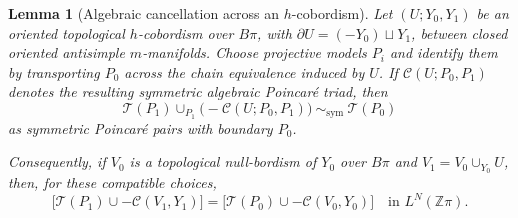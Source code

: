 \documentclass[10pt,reqno]{amsart}
\numberwithin{equation}{section}
\newtheorem{lemma}{Lemma}
\theoremstyle{definition}
\theoremstyle{remark}
\newcommand{\Z}{\mathbb Z}
\begin{document}
\begin{lemma}[Algebraic cancellation across an \(h\)-cobordism]
\label{lem:absolute-rho-hcob-cancellation}
Let \((U;Y_0,Y_1)\) be an oriented topological \(h\)-cobordism over
\(B\pi\), with
\(\partial U=(-Y_0)\sqcup Y_1\), between closed oriented antisimple
\(m\)-manifolds.  Choose projective models \(P_i\) and identify them
by transporting \(P_0\) across the chain equivalence induced by
\(U\).  If
\(\mathcal C(U;P_0,P_1)\) denotes the resulting symmetric algebraic
Poincar\'e triad, then
\begin{equation}\label{eq:absolute-rho-relative-cancellation}
\mathcal T(P_1)
\cup_{P_1}
\bigl(-\mathcal C(U;P_0,P_1)\bigr)
\ \sim_{\mathrm{sym}}\
\mathcal T(P_0)
\end{equation}
as symmetric Poincar\'e pairs with boundary \(P_0\).

Consequently, if \(V_0\) is a topological null-bordism of \(Y_0\)
over \(B\pi\) and \(V_1=V_0\cup_{Y_0}U\), then, for these compatible
choices,
\begin{equation}\label{eq:absolute-rho-hcob-upstairs}
\bigl[
\mathcal T(P_1)\cup-\mathcal C(V_1,Y_1)
\bigr]
=
\bigl[
\mathcal T(P_0)\cup-\mathcal C(V_0,Y_0)
\bigr]
\quad\text{in }L^N(\Z\pi).
\end{equation}
\end{lemma}
\end{document}
